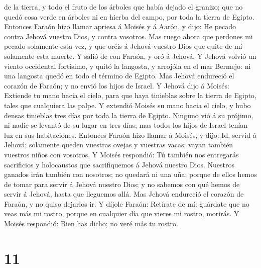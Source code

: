de la tierra, y todo el fruto de los árboles que había dejado el
granizo; que no quedó cosa verde en árboles ni en hierba del campo, por
toda la tierra de Egipto.  Entonces Faraón hizo llamar
apriesa á Moisés y á Aarón, y dijo: He pecado contra Jehová vuestro
Dios, y contra vosotros.  Mas ruego ahora que perdones mi
pecado solamente esta vez, y que oréis á Jehová vuestro Dios que quite
de mí solamente esta muerte.  Y salió de con Faraón, y oró
á Jehová.  Y Jehová volvió un viento occidental fortísimo,
y quitó la langosta, y arrojóla en el mar Bermejo: ni una langosta quedó
en todo el término de Egipto.  Mas Jehová endureció el
corazón de Faraón; y no envió los hijos de Israel.  Y
Jehová dijo á Moisés: Extiende tu mano hacia el cielo, para que haya
tinieblas sobre la tierra de Egipto, tales que cualquiera las palpe.
 Y extendió Moisés su mano hacia el cielo, y hubo densas
tinieblas tres días por toda la tierra de Egipto.  Ninguno
vió á su prójimo, ni nadie se levantó de su lugar en tres días; mas
todos los hijos de Israel tenían luz en sus habitaciones. 
Entonces Faraón hizo llamar á Moisés, y dijo: Id, servid á Jehová;
solamente queden vuestras ovejas y vuestras vacas: vayan también
vuestros niños con vosotros.  Y Moisés respondió: Tú
también nos entregarás sacrificios y holocaustos que sacrifiquemos á
Jehová nuestro Dios.  Nuestros ganados irán también con
nosotros; no quedará ni una uña; porque de ellos hemos de tomar para
servir á Jehová nuestro Dios; y no sabemos con qué hemos de servir á
Jehová, hasta que lleguemos allá.  Mas Jehová endureció el
corazón de Faraón, y no quiso dejarlos ir.  Y díjole
Faraón: Retírate de mí: guárdate que no veas más mi rostro, porque en
cualquier día que vieres mi rostro, morirás.  Y Moisés
respondió: Bien has dicho; no veré más tu rostro.

\hypertarget{section-10}{%
\section{11}\label{section-10}}

